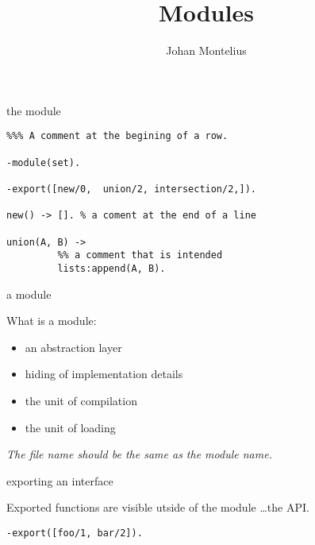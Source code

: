 

\title[ID1019 Modules]{Modules}

\author{Johan Montelius}
\date{\semester}



\begin{frame}
\titlepage
\end{frame}

\begin{frame}[fragile]{the module}

\begin{verbatim}
%%% A comment at the begining of a row.

-module(set).

-export([new/0,  union/2, intersection/2,]).

new() -> []. % a coment at the end of a line

union(A, B) -> 
         %% a comment that is intended
         lists:append(A, B).
\end{verbatim}
\end{frame}

\begin{frame}{a module}

What is a module: 

\begin{itemize}
\pause
\item an abstraction layer
\pause
\item hiding of implementation details
\pause
\item the unit of compilation
\pause
\item the unit of loading
\end{itemize}

\pause\vspace{40pt}
{\em The file name should be the same as the module name.}

\end{frame}

\begin{frame}[fragile]{exporting an interface}

Exported functions are visible utside of the module \ldots the API.
\pause

\begin{verbatim}
-export([foo/1, bar/2]).
\end{verbatim}

\end{frame}

